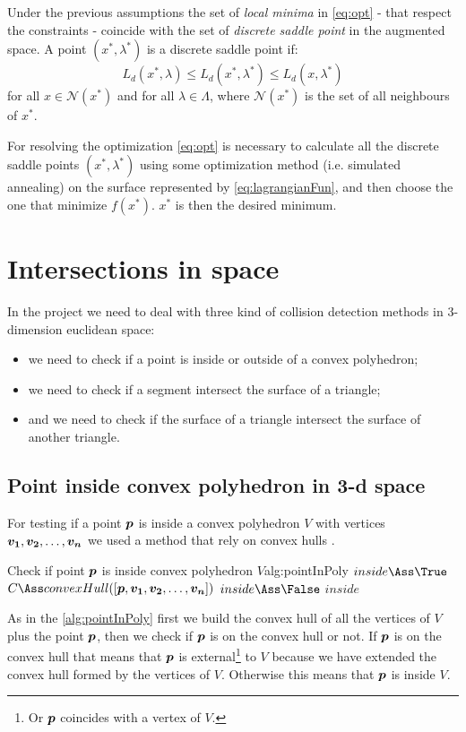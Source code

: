 \documentclass[dissertation.tex]{subfiles}
\begin{document}
Under the previous assumptions the set of \emph{local minima}
in \cref{eq:opt} - that respect the constraints -  coincide
with the set of \emph{discrete saddle point}
in the augmented space. A point $(x^*,\lambda^*)$ is a discrete saddle
point if:
\begin{equation*}
  L_d(x^*,\lambda)\leq L_d(x^*,\lambda^*)\leq L_d(x,\lambda^*)
\end{equation*}
for all $x\in\mathcal{N}(x^*)$ and for all $\lambda\in\Lambda$, where
$\mathcal{N}(x^*)$ is the set of all neighbours of $x^*$.

For resolving the optimization \cref{eq:opt} is necessary to
calculate all the discrete saddle points $(x^*,\lambda^*)$ using some
optimization method (i.e. simulated annealing) on the surface
represented by
\cref{eq:lagrangianFun}, and then choose
the one that minimize $f(x^*)$. $x^*$ is then the desired minimum.

\section{Intersections in space}\label{sec:intersections}
In the project we need to deal with three kind of collision detection
methods in 3-dimension euclidean space:
\begin{itemize}
\item we need to check if a point is inside or outside
  of a convex polyhedron;
\item we need to check if a segment intersect the
  surface of a triangle;
\item and we need to check if the surface of a
  triangle intersect the surface of another triangle.
\end{itemize}

\subsection{Point inside convex polyhedron in 3-d space}
For testing if a point $\boldsymbol{p}$ is inside a convex polyhedron $V$ with
vertices $\boldsymbol{v_1},\boldsymbol{v_2},\dots,\boldsymbol{v_n}$ we used a method that rely
on convex hulls \cite{deberg}\cite{schneider}.

\begin{algo}{Check if point $\boldsymbol{p}$ is inside convex polyhedron $V$}{alg:pointInPoly}
  \State $inside\Ass\True$
  \State $C\Ass convexHull([\ve{p},\ve{v_1},\ve{v_2},\dots,\ve{v_n}])$
  \label{ln:pointInPolyFor}
  \State $inside\Ass\False$
  \State \Break
  \EndIf
  \EndFor
  \State\Return $inside$
  \EndFunction
\end{algo}
As in the \cref{alg:pointInPoly} first we build the convex hull of all
the vertices of $V$ plus the point $\boldsymbol{p}$, then we check if $\boldsymbol{p}$
is on the convex hull or not. If $\boldsymbol{p}$ is on the convex hull that
means that $\boldsymbol{p}$ is external\footnote{Or $\boldsymbol{p}$ coincides with a
  vertex of $V$.} to $V$ because we have extended the convex hull
formed by the vertices of $V$. Otherwise this means that $\boldsymbol{p}$ is
inside $V$.
\end{document}
